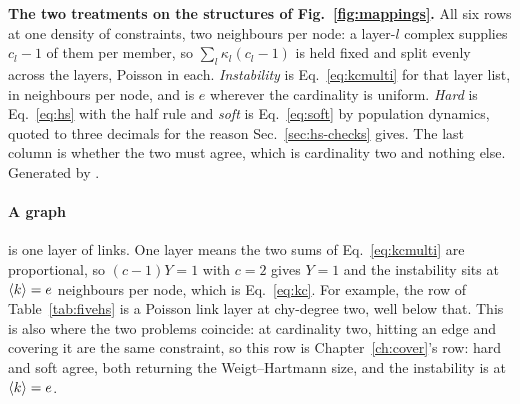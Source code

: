 \begin{table}[t]
\centering\small
\begin{adjustbox}{max width=\linewidth}

\end{adjustbox}
\caption{\textbf{The two treatments on the structures of
Fig.~\ref{fig:mappings}.} All six rows at one density of constraints, two
neighbours per node: a layer-$l$ complex supplies $c_{l}-1$ of them per member,
so $\sum_{l}\kappa_{l}(c_{l}-1)$ is held fixed and split evenly across the
layers, Poisson in each. \emph{Instability} is Eq.~\eqref{eq:kcmulti} for that
layer list, in neighbours per node, and is $e$ wherever the cardinality is
uniform. \emph{Hard} is Eq.~\eqref{eq:hs} with the half rule and \emph{soft} is
Eq.~\eqref{eq:soft} by population dynamics, quoted to three decimals for the
reason Sec.~\ref{sec:hs-checks} gives. The last column is whether the two must
agree, which is cardinality two and nothing else. Generated by
.}
\label{tab:fivehs}
\end{table}

\paragraph{A graph} is one layer of links. One layer means the two sums of
Eq.~\eqref{eq:kcmulti} are proportional, so $(c-1)Y=1$ with $c=2$ gives $Y=1$
and the instability sits at $\langle k \rangle=e$ neighbours per node, which is
Eq.~\eqref{eq:kc}. For example, the row of Table~\ref{tab:fivehs} is a Poisson
link layer at chy-degree two, well below that. This is also where the two
problems coincide: at cardinality two,
hitting an edge and covering it are the same constraint, so this row is
Chapter~\ref{ch:cover}'s row: hard and soft agree, both returning the
Weigt--Hartmann size, and the instability is at $\langle k \rangle=e$.

